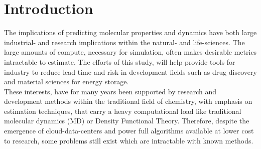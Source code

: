 \section{Introduction}\label{sec:intro}

The implications of predicting molecular properties and dynamics have both large industrial- and research implications within
the natural- and life-sciences. The large amounts of compute, necessary for simulation, often makes desirable metrics intractable
to estimate. The efforts of this study, will help provide tools for industry to reduce lead time and risk in development fields
such as drug discovery and material sciences for energy storage\cite{Busk2021}.  \\

These interests, have for many years been supported by research and development methods within
the traditional field of chemistry, with emphasis on estimation techniques, that carry a heavy computational load like traditional
molecular dynamics (MD)\cite{Behler2011} or Density Functional Theory\cite{Busk2021}. Therefore, despite the emergence of
cloud-data-centers and power full algorithms available at lower cost to research, some problems still exist which are intractable
with known methods.\\

